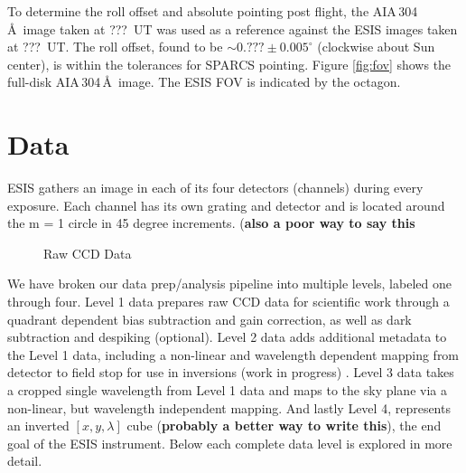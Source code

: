 		To determine the roll offset and absolute pointing post flight, the AIA\,304\,\AA\ image taken at ???~UT was used as a reference against the ESIS images taken at ???~UT.  The roll offset, found to be $\sim0.???\pm 0.005^\circ$ (clockwise about Sun center), is within the tolerances for SPARCS pointing.  Figure \ref{fig:fov} shows the full-disk AIA\,304\,\AA\ image. The ESIS FOV is indicated by the octagon.  
	
\section{Data} 

    ESIS gathers an image in each of its four detectors (channels) during every exposure.  
    Each channel has its own grating and detector and is located around the m = 1 circle in 45 degree increments. (\textbf{also a poor way to say this}
    
    \begin{figure}[ht]
        \centering
        \caption{Raw CCD Data}
        \label{fig:Level0}
    \end{figure}
    
    We have broken our data prep/analysis pipeline into multiple levels, labeled one through four.
    Level 1 data prepares raw CCD data for scientific work through a quadrant dependent bias subtraction and gain correction, as well as dark subtraction and despiking (optional).
    Level 2 data adds additional metadata  to the Level 1 data, including a non-linear and wavelength dependent mapping from detector to field stop for use in inversions (work in progress)  . 
    Level 3 data takes a cropped single wavelength from Level 1 data and maps to the sky plane via a non-linear, but wavelength independent mapping. 
    And lastly Level 4, represents an inverted  $[x, y , \lambda]$  cube (\textbf{probably a better way to write this}), the end goal of the ESIS instrument. 
    Below each complete data level is explored in more detail.
    
